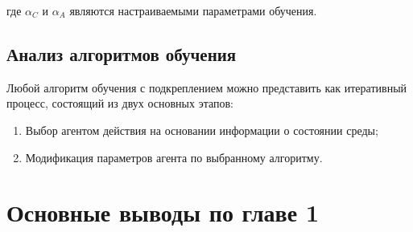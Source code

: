 \noindent где $ \alpha_C $ и $ \alpha_A $ являются настраиваемыми параметрами обучения.

 
\subsection{Анализ алгоритмов обучения} \label{subsect1_6_7}

Любой алгоритм обучения с подкреплением можно представить как итеративный процесс, состоящий из двух основных этапов:

\begin{enumerate}
	\item Выбор агентом действия на основании информации о состоянии среды;
	\item Модификация параметров агента по выбранному алгоритму.
\end{enumerate}

\section{Основные выводы по главе 1} \label{sect1_7}
